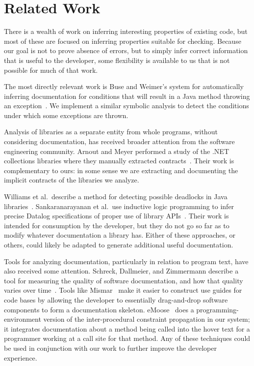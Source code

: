 \section{Related Work}
There is a wealth of work on inferring interesting properties of existing code,
but most of these are focused on inferring properties suitable for checking.
Because our goal is not to prove absence of errors, but to simply infer correct
information that is useful to the developer, some flexibility is available to us
that is not possible for much of that work.

The most directly relevant work is Buse and Weimer's system for automatically
inferring documentation for conditions that will result in a Java method
throwing an exception~\cite{autodoc}.  We implement a similar symbolic analysis
to detect the conditions under which some exceptions are thrown.

Analysis of libraries as a separate entity from whole programs, without
considering documentation, has received broader attention from the software
engineering community.  Arnout and Meyer performed a study of the .NET
collections libraries where they manually extracted
contracts~\cite{findingcontracts}.  Their work is complementary to ours: in some
sense we are extracting and documenting the implicit contracts of the libraries
we analyze.

Williams et al.~describe a method for detecting possible deadlocks in Java
libraries~\cite{deadlocklibs}.  Sankaranarayanan et al.~use inductive logic
programming to infer precise Datalog specifications of proper use of library
APIs~\cite{mininglibspecs}.  Their work is intended for consumption by the
developer, but they do not go so far as to modify whatever documentation a
library has.  Either of these approaches, or others, could likely be adapted to
generate additional useful documentation.

Tools for analyzing documentation, particularly in relation to program text,
have also received some attention.  Schreck, Dallmeier, and Zimmermann describe
a tool for measuring the quality of software documentation, and how that
quality varies over time~\cite{evolvedoc}. Tools like Mismar~\cite{mismar} make
it easier to construct use guides for code bases by allowing the developer to
essentially drag-and-drop software components to form a documentation skeleton.
eMoose~\cite{emoose} does a programming-environment version of the
inter-procedural constraint propagation in our system; it integrates
documentation about a method being called into the hover text for a programmer
working at a call site for that method.  Any of these techniques could be used
in conjunction with our work to further improve the developer experience.


